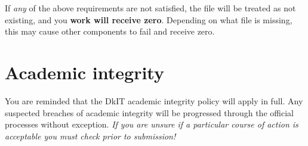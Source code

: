 \documentclass[10pt]{article}
\begin{document}
If \textit{any} of the above requirements are not satisfied, the file will be treated as not existing, and you \textbf{work will receive zero}. Depending on what file is missing, this may cause other components to fail and receive zero.


\section{Academic integrity}

You are reminded that the DkIT academic integrity policy will apply in full.
Any suspected breaches of academic integrity will be progressed through the official processes without exception.
\textit{If you are unsure if a particular course of action is acceptable you must check prior to submission!}
\end{document}
